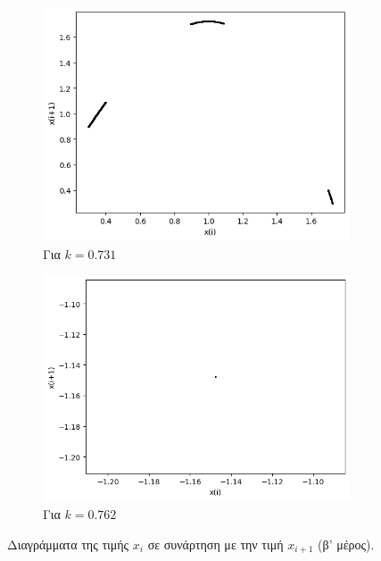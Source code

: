 \begin{figure}[ht]
\begin{subfigure}[b]{0.4\textwidth}
		\includegraphics[width=\textwidth]{LateX images/graphs q12/g11}
		\caption{Για $k=0.731$}
		\label{f:k67}
	\end{subfigure}
	\hfill
	\begin{subfigure}[b]{0.4\textwidth}
		\centering
		\includegraphics[width=\textwidth]{LateX images/graphs q12/g12}
		\caption{Για $k=0.762$}
		\label{f:k68}
	\end{subfigure}
	\hfill
	\caption{Διαγράμματα της τιμής \(x_i\) σε συνάρτηση με την τιμή \(x_{i+1}\) (β' μέρος).}	
\end{figure}

\clearpage

